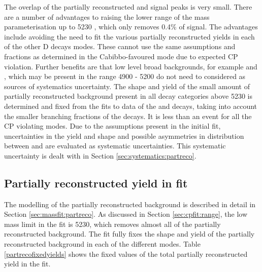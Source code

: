 The overlap of the partially reconstructed and signal peaks is very small. There are a number of advantages to raising the lower range of the mass parameterisation up to 5230 \mev, which only removes 0.4\% of signal. The advantages include avoiding the need to fit the various partially reconstructed yields in each of the other D decays modes. These cannot use the same assumptions and fractions as determined in the Cabibbo-favoured mode due to expected CP violation. Further benefits are that low level broad backgrounds, for example \decay{\Bm}{\D\Kstarm\piz} and \decay{\Bd}{\Kp\pim\pip\pim}, which may be present in the range 4900 - 5200 \mev do not need to considered as sources of systematics uncertainty. The shape and yield of the small amount of partially reconstructed background present in all \D decay categories above 5230 \mev is determined and fixed from the fits to data of the \kpi and \kpipipi decays, taking into account the smaller branching fractions of the \D decays. It is less than an event for all the CP violating modes. Due to the assumptions present in the initial fit, uncertainties in the yield and shape and possible asymmetries in distribution between \Bp and \Bm are evaluated as systematic uncertainties. This systematic uncertainty is dealt with in Section \ref{sec:systematics:partreco}.

\subsection{Partially reconstructed yield in \CP fit}
\label{sec:cpfit:partrecoyields}

The modelling of the partially reconstructed background is described in detail in Section \ref{sec:massfit:partreco}. As discussed in Section \ref{sec:cpfit:range}, the low mass limit in the \CP fit is 5230\mevcc, which removes almost all of the partially reconstructed background. The \CP fit fully fixes the shape and yield of the partially reconstructed background in each of the different \Dz modes. Table \ref{partrecofixedyields} shows the fixed values of the total partially reconstructed yield in the \CP fit.

